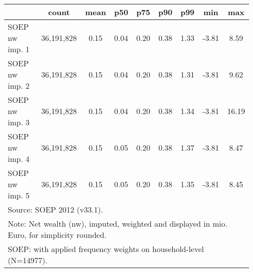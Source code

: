 {
\def\sym#1{\ifmmode^{#1}\else\(^{#1}\)\fi}
\begin{tabular}{l*{1}{cccccccc}}
\hline\hline
                                            &       count&        mean&         p50&         p75&         p90&         p99&         min&         max\\
\hline
SOEP nw imp. 1                              &  36,191,828&        0.15&        0.04&        0.20&        0.38&        1.33&       -3.81&        8.59\\
SOEP nw imp. 2                              &  36,191,828&        0.15&        0.04&        0.20&        0.38&        1.31&       -3.81&        9.62\\
SOEP nw imp. 3                              &  36,191,828&        0.15&        0.04&        0.20&        0.38&        1.34&       -3.81&       16.19\\
SOEP nw imp. 4                              &  36,191,828&        0.15&        0.05&        0.20&        0.38&        1.37&       -3.81&        8.47\\
SOEP nw imp. 5                              &  36,191,828&        0.15&        0.05&        0.20&        0.38&        1.35&       -3.81&        8.45\\
\hline\hline
\multicolumn{9}{l}{\footnotesize Source: SOEP 2012 (v33.1).}\\
\multicolumn{9}{l}{\footnotesize Note: Net wealth (nw), imputed, weighted and displayed in mio. Euro, for simplicity rounded.}\\
\multicolumn{9}{l}{\footnotesize SOEP: with applied frequency weights on household-level (N=14977).}\\
\end{tabular}
}
